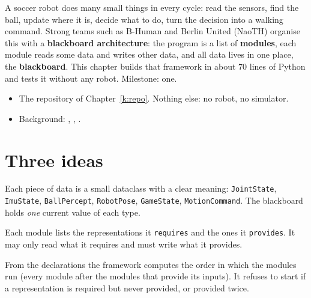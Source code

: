 \label{k:bb}

A soccer robot does many small things in every cycle: read the sensors, find the ball, update where it is, decide what to do, turn the decision into a walking command. Strong teams such as B-Human and Berlin United (NaoTH) organise this with a \textbf{blackboard architecture}: the program is a list of \textbf{modules}, each module reads some data and writes other data, and all data lives in one place, the \textbf{blackboard}. This chapter builds that framework in about $70$ lines of Python and tests it without any robot. Milestone: one.

\begin{needbox}
\begin{itemize}[nosep]
  \item The repository of Chapter~\ref{k:repo}. Nothing else: no robot, no simulator.
  \item Background: , , .
\end{itemize}
\end{needbox}

\section*{Three ideas}
\begin{description}[leftmargin=0.6cm]
  \item[Representations.] Each piece of data is a small dataclass with a clear meaning: \texttt{JointState}, \texttt{ImuState}, \texttt{BallPercept}, \texttt{RobotPose}, \texttt{GameState}, \texttt{MotionCommand}. The blackboard holds \emph{one} current value of each type.
  \item[Modules declare what they need.] Each module lists the representations it \texttt{requires} and the ones it \texttt{provides}. It may only read what it requires and must write what it provides.
  \item[The framework finds the order.] From the declarations the framework computes the order in which the modules run (every module after the modules that provide its inputs). It refuses to start if a representation is required but never provided, or provided twice.
\end{description}

